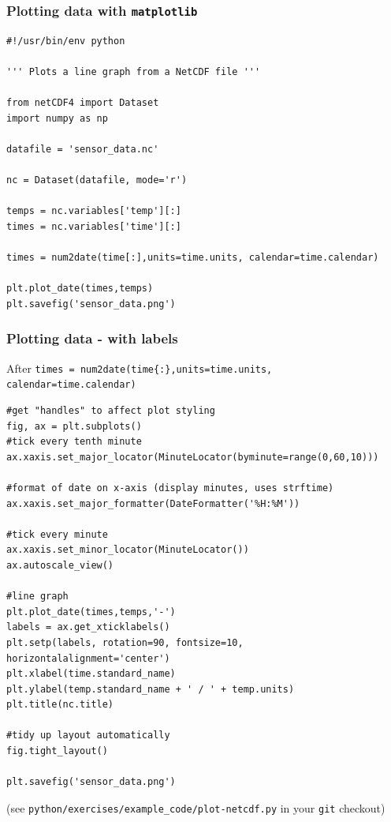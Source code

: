 \documentclass[aspectratio=1610,9pt]{beamer} %
\begin{document}
\begin{frame}[fragile]
    \frametitle{Plotting data with \texttt{matplotlib}}

\begin{verbatim}
#!/usr/bin/env python

''' Plots a line graph from a NetCDF file '''

from netCDF4 import Dataset
import numpy as np

datafile = 'sensor_data.nc'

nc = Dataset(datafile, mode='r')

temps = nc.variables['temp'][:]
times = nc.variables['time'][:]

times = num2date(time[:],units=time.units, calendar=time.calendar)

plt.plot_date(times,temps)
plt.savefig('sensor_data.png')
\end{verbatim}

\end{frame}
\begin{frame}[fragile]
\frametitle{Plotting data - with labels}

After
\texttt{times = num2date(time\{:\},units=time.units, calendar=time.calendar)}

\begin{verbatim}
#get "handles" to affect plot styling
fig, ax = plt.subplots()
#tick every tenth minute
ax.xaxis.set_major_locator(MinuteLocator(byminute=range(0,60,10)))

#format of date on x-axis (display minutes, uses strftime)
ax.xaxis.set_major_formatter(DateFormatter('%H:%M'))

#tick every minute
ax.xaxis.set_minor_locator(MinuteLocator())
ax.autoscale_view()

#line graph
plt.plot_date(times,temps,'-')
labels = ax.get_xticklabels()
plt.setp(labels, rotation=90, fontsize=10, horizontalalignment='center')
plt.xlabel(time.standard_name)
plt.ylabel(temp.standard_name + ' / ' + temp.units)
plt.title(nc.title)

#tidy up layout automatically
fig.tight_layout()

plt.savefig('sensor_data.png')
\end{verbatim}

(see \texttt{python/exercises/example\_code/plot-netcdf.py} in your
\texttt{git} checkout)

\end{frame}
\end{document}
